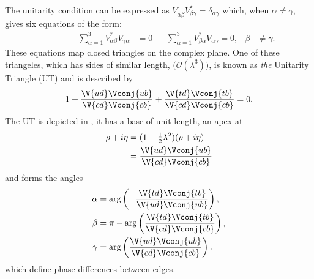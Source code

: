 The unitarity condition can be expressed as
$V_{\alpha\beta}^{\phantom{\dagger}}V_{\beta\gamma}^* = \delta_{\alpha\gamma}$
which, when $\alpha\neq\gamma$, gives six equations of the form:
\begin{align}
  \phantom{\beta\neq\gamma}&&\sum_{\alpha=1}^3V_{\alpha\beta}^*V_{\gamma\alpha}^{\phantom{*}} &= 0
  && \sum_{\alpha=1}^3V_{\beta\alpha}^*V_{\alpha\gamma}^{\phantom{*}}=0, & \beta&\neq\gamma.
  \label{eq:th:offdiag}
\end{align}
These equations map closed triangles on the complex plane.
One of these triangeles, which has sides of similar length,
$\big(\mathcal{O}(\lambda^3)\big)$,
is known as \emph{the} Unitarity Triangle (UT) and is described by
\begin{equation}
  1 + \frac{\V{ud}\Vconj{ub}}{\V{cd}\Vconj{cb}} + \frac{\V{td}\Vconj{tb}}{\V{cd}\Vconj{cb}} = 0.
  \label{eq:th:ut}
\end{equation}
The UT is depicted in , it has a base of unit length, an apex at
\begin{align}
  \bar\rho+i\bar\eta &= (1-\tfrac12\lambda^2)(\rho+i\eta) \nonumber\\
  &=\frac{\V{ud}\Vconj{ub}}{\V{cd}\Vconj{cb}}
\end{align}
and forms the angles
\begin{align}
  \alpha &=    \arg\left(-\frac{\V{td}\Vconj{tb}}{\V{ud}\Vconj{ub}}\right), \nonumber\\
  \beta  &=\pi-\arg\left( \frac{\V{td}\Vconj{tb}}{\V{cd}\Vconj{cb}}\right), \nonumber\\
  \gamma &=    \arg\left( \frac{\V{ud}\Vconj{ub}}{\V{cd}\Vconj{cb}}\right).
\end{align}
which define phase differences between edges.

